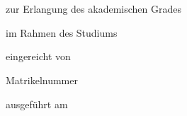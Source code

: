 \begin{otherlanguage}{ngerman}

\begin{center}
{\ \vspace{2.8cm}}

\begin{minipage}[t][2.8cm][t]{\textwidth}%
\begin{center}
{\thesistitlefontHUGE\sffamily\bfseries\tuinfthesistitle}\\
\bigskip
{\thesistitlefonthuge\sffamily\bfseries\tuinfthesissubtitle}
\end{center}
\end{minipage}

\vspace{2.0cm}

{\thesistitlefontLARGE\sffamily \tuinfthesistype}

\vspace{6mm}

{\thesistitlefontlarge\sffamily zur Erlangung des akademischen Grades}

\vspace{6mm}

{\thesistitlefontLARGE\sffamily\bfseries \tuinfthesisdegree}

\vspace{6mm}

{\thesistitlefontlarge\sffamily im Rahmen des Studiums}

\vspace{6mm}

{\thesistitlefontLarge\sffamily\bfseries \tuinfthesiscurriculum}

\vspace{6.5mm}

{\thesistitlefontlarge\sffamily eingereicht von}

\vspace{6mm}

{\thesistitlefontLarge\sffamily\bfseries \tuinfthesisauthor}

\vspace{1.5mm}

{\thesistitlefontlarge\sffamily Matrikelnummer \tuinfthesismatrikelno} 

\vspace{1.0cm}

\begin{minipage}[t][2.5cm][t]{\textwidth}%
  \vspace{0pt}\raggedright\thesistitlefontnormalsize\sffamily
  ausgef\"uhrt am


\end{minipage}
\end{center}
\end{otherlanguage}
